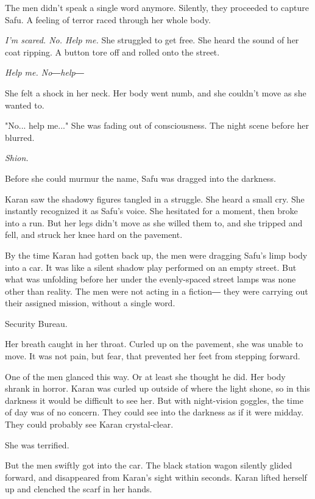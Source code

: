 The men didn't speak a single word anymore. Silently, they proceeded to
capture Safu. A feeling of terror raced through her whole body.

\emph{I'm scared. No. Help me.} She struggled to get free. She heard the sound
of her coat ripping. A button tore off and rolled onto the street.

\emph{Help me. No―help―}

She felt a shock in her neck. Her body went numb, and she couldn't move
as she wanted to.

"No... help me..." She was fading out of consciousness. The night scene
before her blurred.

\emph{Shion.}

Before she could murmur the name, Safu was dragged into the darkness.

\myspace

Karan saw the shadowy figures tangled in a struggle. She heard a small
cry. She instantly recognized it as Safu's voice. She hesitated for a
moment, then broke into a run. But her legs didn't move as she willed
them to, and she tripped and fell, and struck her knee hard on the
pavement.

By the time Karan had gotten back up, the men were dragging Safu's limp
body into a car. It was like a silent shadow play performed on an empty
street. But what was unfolding before her under the evenly-spaced street
lamps was none other than reality. The men were not acting in a fiction―
they were carrying out their assigned mission, without a single word.

Security Bureau.

Her breath caught in her throat. Curled up on the pavement, she was
unable to move. It was not pain, but fear, that prevented her feet from
stepping forward.

One of the men glanced this way. Or at least she thought he did. Her
body shrank in horror. Karan was curled up outside of where the light
shone, so in this darkness it would be difficult to see her. But with
night-vision goggles, the time of day was of no concern. They could see
into the darkness as if it were midday. They could probably see Karan
crystal-clear.

She was terrified.

But the men swiftly got into the car. The black station wagon silently
glided forward, and disappeared from Karan's sight within seconds. Karan
lifted herself up and clenched the scarf in her hands.


